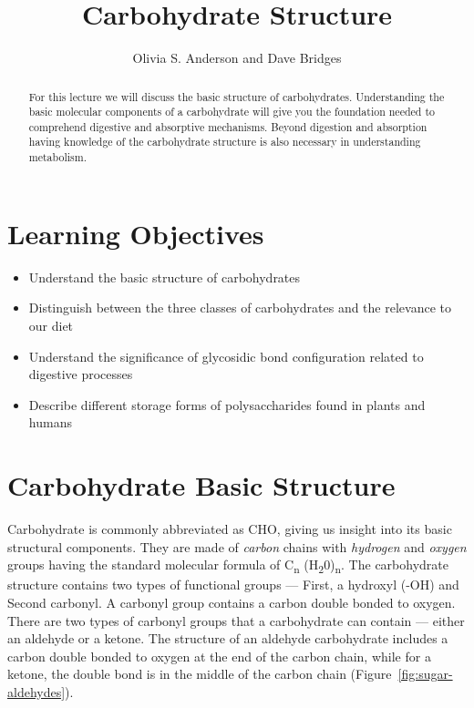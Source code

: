\documentclass{tufte-handout}
\title{Carbohydrate Structure}
\author{Olivia S. Anderson and Dave Bridges}
\date{}  %
\begin{document}
\maketitle%

\begin{abstract}
For this lecture we will discuss the basic structure of carbohydrates. Understanding the basic molecular components of a carbohydrate will give you the foundation needed to comprehend digestive and absorptive mechanisms. Beyond digestion and absorption having knowledge of the carbohydrate structure is also necessary in understanding metabolism. 
\end{abstract}

\tableofcontents


\pagebreak

\section{Learning Objectives}

\begin{itemize}
\item Understand the basic structure of carbohydrates
\item Distinguish between the three classes of carbohydrates and the relevance to our diet
\item Understand the significance of glycosidic bond configuration related to digestive processes
\item Describe different storage forms of polysaccharides found in plants and humans
\end{itemize}

\section{Carbohydrate Basic Structure}\label{carbohydrate-basic-structure}
Carbohydrate is commonly abbreviated as CHO, giving us insight into its basic structural components. They are made of \emph{carbon} chains with \emph{hydrogen} and \emph{oxygen} groups having the standard molecular formula of C\textsubscript{n} (H\textsubscript{2}0)\textsubscript{n}. The carbohydrate structure contains two types of functional groups --- First, a hydroxyl (-OH) and Second carbonyl. A carbonyl group contains a carbon double bonded to oxygen. There are two types of carbonyl groups that a carbohydrate can contain --- either an aldehyde or a ketone. The structure of an aldehyde carbohydrate includes a carbon double bonded to oxygen at the end of the carbon chain, while for a ketone, the double bond is in the middle of the carbon chain (Figure~\ref{fig:sugar-aldehydes}).
\end{document}
